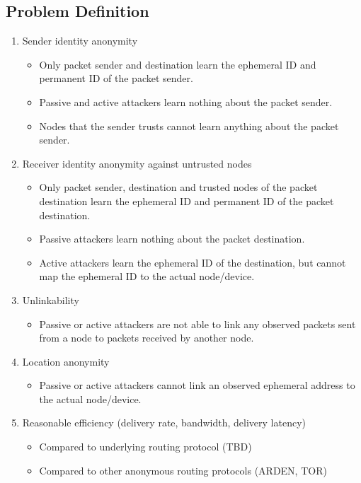 \documentclass[11pt]{article}
\begin{document}
\subsection{Problem Definition}
\label{problem}
\begin{enumerate}
\item Sender identity anonymity
  \begin{itemize}
  \item Only packet sender and destination learn the ephemeral ID and permanent ID of the packet sender. 
  \item Passive and active attackers learn nothing about the packet sender.
  \item Nodes that the sender trusts cannot learn anything about the packet sender. 
  \end{itemize}

\item Receiver identity anonymity against untrusted nodes
  \begin{itemize}
  \item Only packet sender, destination and trusted nodes of the packet destination learn the ephemeral ID and permanent ID of the packet destination. 
  \item Passive attackers learn nothing about the packet destination.
  \item Active attackers learn the ephemeral ID of the destination, but cannot map the ephemeral ID to the actual node/device.
  \end{itemize}

\item Unlinkability
  \begin{itemize}
  \item Passive or active attackers are not able to link any observed packets sent from a node to packets received by another node.   
  \end{itemize}

\item Location anonymity 
  \begin{itemize}
  \item Passive or active attackers cannot link an observed ephemeral address to the actual node/device.
  \end{itemize}

\item Reasonable efficiency (delivery rate, bandwidth, delivery latency)
	\begin{itemize}
	\item Compared to underlying routing protocol (TBD)
	\item Compared to other anonymous routing protocols (ARDEN, TOR)
	\end{itemize}

\end{enumerate}
\end{document}
